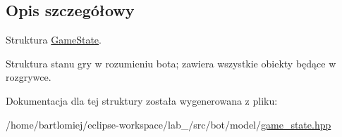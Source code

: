 \subsection{Opis szczegółowy}
Struktura \hyperlink{structmodel_1_1GameState}{Game\+State}. 

Struktura stanu gry w rozumieniu bota; zawiera wszystkie obiekty będące w rozgrywce. 

Dokumentacja dla tej struktury została wygenerowana z pliku\+:\begin{DoxyCompactItemize}
\item 
/home/bartlomiej/eclipse-\/workspace/lab\+\_/src/bot/model/\hyperlink{game__state_8hpp}{game\+\_\+state.\+hpp}\end{DoxyCompactItemize}
